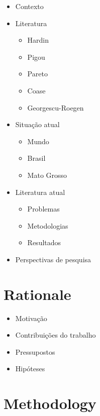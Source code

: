 \documentclass[a4paper,12pt]{article}
\begin{document}
\begin{itemize}
    \item Contexto
    
    \item Literatura
    \begin{itemize}
        \item Hardin
        \item Pigou
        \item Pareto
        \item Coase
        \item Georgescu-Roegen
    \end{itemize}
    
    \item Situação atual
    \begin{itemize}
        \item Mundo
        \item Brasil
        \item Mato Grosso
    \end{itemize}
   
    \item Literatura atual
    \begin{itemize}
        \item Problemas
        \item Metodologias
        \item Resultados
    \end{itemize}
    
    \item Perspectivas de pesquisa
\end{itemize}

\section{Rationale}

\begin{itemize}
    \item Motivação
    \item Contribuições do trabalho
    \item Pressupostos
    \item Hipóteses
\end{itemize}

\section{Methodology}
\end{document}
